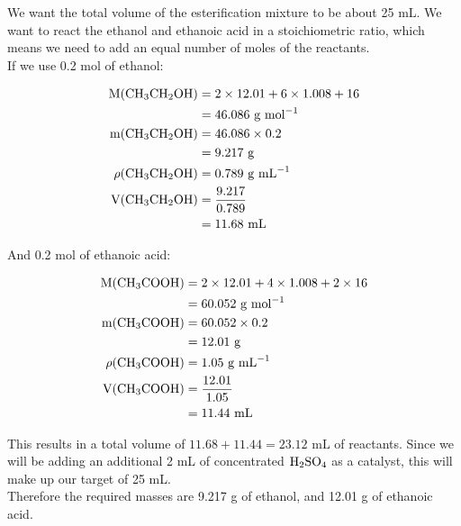 \documentclass[a4paper,11pt]{article}
\begin{document}
We want the total volume of the esterification mixture to be about 25 mL. We want to
react the ethanol and ethanoic acid in a stoichiometric ratio, which means we
need to add an equal number of moles of the reactants. \\

If we use 0.2 mol of ethanol:

$$
\begin{aligned}
	\mbox{M($\ce{CH3CH2OH}$)} & = 2 \times 12.01 + 6 \times 1.008 + 16 \\
			& = 46.086\mbox{ g mol}^{-1} \\
	\mbox{m($\ce{CH3CH2OH}$)} & = 46.086 \times 0.2 \\
			& = 9.217\mbox{ g} \\
	\rho\mbox{($\ce{CH3CH2OH}$)} & = 0.789\mbox{ g mL}^{-1} \\
	\mbox{V($\ce{CH3CH2OH}$)} & = \frac{9.217}{0.789} \\
			& = 11.68\mbox{ mL} \\
\end{aligned}
$$

And 0.2 mol of ethanoic acid:

$$
\begin{aligned}
	\mbox{M($\ce{CH3COOH}$)} & = 2 \times 12.01 + 4 \times 1.008 + 2 \times 16 \\
							& = 60.052\mbox{ g mol}^{-1} \\
	\mbox{m($\ce{CH3COOH}$)} & = 60.052 \times 0.2 \\
			& = 12.01\mbox{ g} \\
	\rho\mbox{($\ce{CH3COOH}$)} & = 1.05\mbox{ g mL}^{-1} \\
	\mbox{V($\ce{CH3COOH}$)} & = \frac{12.01}{1.05} \\
			& = 11.44\mbox{ mL} \\
\end{aligned}
$$

This results in a total volume of $11.68 + 11.44 = 23.12\mbox{ mL}$ of
reactants. Since we will be adding an additional 2 mL of concentrated
$\ce{H2SO4}$ as a catalyst, this will make up our target of 25 mL. \\

Therefore the required masses are 9.217 g of ethanol, and 12.01 g of ethanoic
acid.


\end{document}
